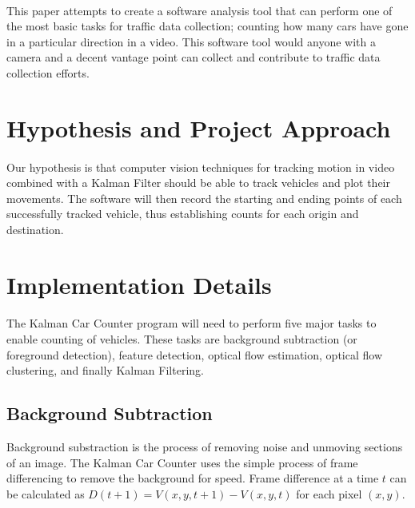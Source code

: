 \documentclass{article} %
\begin{document}
\paragraph{} This paper attempts to create a software analysis tool that can perform one of the most basic tasks for traffic data collection; counting how many cars have gone in a particular direction in a video. This software tool would anyone with a camera and a decent vantage point can collect and contribute to traffic data collection efforts. 

\section{Hypothesis and Project Approach}
\label{headings}
\paragraph{}Our hypothesis is that computer vision techniques for tracking motion in video combined with a Kalman Filter should be able to track vehicles and plot their movements. The software will then record the starting and ending points of each successfully tracked vehicle, thus establishing counts for each origin and destination.

\paragraph*{} 

\section{Implementation Details}
\label{headings}
\paragraph{}The Kalman Car Counter program will need to perform five major tasks to enable counting of vehicles. These tasks are background subtraction (or foreground detection), feature detection, optical flow estimation, optical flow clustering, and finally Kalman Filtering.
\subsection{Background Subtraction}
Background substraction is the process of removing noise and unmoving sections of an image.  The Kalman Car Counter uses the simple process of frame differencing to remove the background for speed. Frame difference at a time $t$ can be calculated as 
$ D(t+1) = V(x,y,t+1) - V(x,y,t) $ for each pixel $(x,y)$.\cite{Birgi09} 
\end{document}
